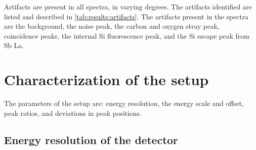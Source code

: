 
Artifacts are present in all spectra, in varying degrees.
The artifacts identified are listed and described in \cref{tab:results:artifacts}.
The artifacts present in the spectra are the background, the noise peak, the carbon and oxygen stray peak, coincidence peaks, the internal Si fluorescence peak, and the Si escape peak from Sb La.






























\section{Characterization of the setup}
\label{results:setup}

The parameters of the setup are: energy resolution, the energy scale and offset, peak ratios, and deviations in peak positions.



\subsection*{Energy resolution of the detector}
\label{results:setup:energy_resolution}

